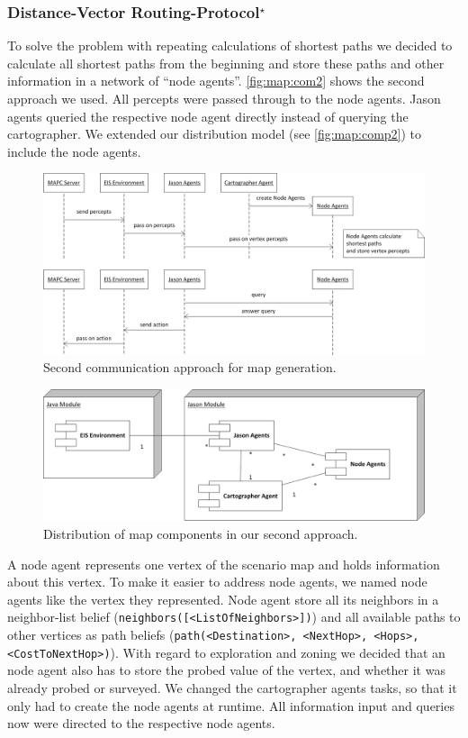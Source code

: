 \subsubsection[Distance-Vector Routing Protocol]{Distance-Vector Routing-Protocol$^\star$}\label{alg:map_dv}
To solve the problem with repeating calculations of shortest paths we decided to calculate all shortest paths from the beginning and store these paths and other information in a network of ``node agents''. \autoref{fig:map:com2} shows the second approach we used. All percepts were passed through to the node agents. Jason agents queried the respective node agent directly instead of querying the cartographer. We extended our distribution model (see \autoref{fig:map:comp2}) to include the node agents.
\begin{figure}
  \centering
  \includegraphics[width=\linewidth]{images/map_com_2.png}
  \caption{Second communication approach for map generation.}
  \label{fig:map:com2}
\end{figure}

\begin{figure}
  \centering
  \includegraphics[width=\linewidth]{images/map_comp_2.png}
  \caption{Distribution of map components in our second approach.}
  \label{fig:map:comp2}
\end{figure}

A node agent represents one vertex of the scenario map and holds information about this vertex. To make it easier to address node agents, we named node agents like the vertex they represented. Node agent store all its neighbors in a neighbor-list belief (\texttt{neighbors([<ListOfNeighbors>])}) and all available paths to other vertices as path beliefs (\texttt{path(<Destination>, <NextHop>, <Hops>, <CostToNextHop>)}). With regard to exploration and zoning we decided that an node agent also has to store the probed value of the vertex, and whether it was already probed or surveyed. We changed the cartographer agents tasks, so that it only had to create the node agents at runtime. All information input and queries now were directed to the respective node agents.

